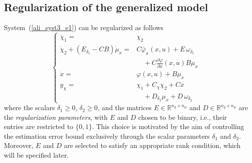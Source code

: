 \documentclass{ifacconf}
\def\eqref#1{(\ref{#1})}
\begin{document}
{%

\subsection{Regularization of the generalized model}
System~\eqref{ali_syst3_e1} can be regularized as follows
\begin{equation}\label{ali_syst3_e2}
\left\{
\begin{array}{rcl}
\dot{\chi}_{1}  = & \chi_{2} 
\\
\dot{\chi}_{2} + \left( E_{\delta_{1}} - C B \right) \dot{\mu}_{x}   = & C  \bar{\varphi}_{x}(x,u)  + E\, \omega_{\delta_{1}}  \\
&\quad+\displaystyle C \frac{\partial \varphi}{\partial x}(x,u) B \mu_{x}
\\ 
\dot{x}  = &  \varphi(x,u) + B \mu_{x} \\
y_{\chi}  = &  \chi_{1} + C_{\chi} \chi_{2} + C x \\%
&\quad +D_{\delta_2} \mu_{x} + D\, \omega_{\delta_{2}} 
\end{array}
\right.
\end{equation}
where the scalars $\delta_1 \geq 0$, $\delta_2 \geq 0$, and the matrices $E\in\mathbb{R}^{n_{y}\times n_{\mu}}$ and $D\in\mathbb{R}^{n_{y}\times n_{\mu}}$ are the {\it regularization parameters}, with $E$ and $D$ chosen to be binary, i.e., their entries are restricted to $\{0,1\}$. This choice is motivated by the aim of controlling the estimation error bound exclusively through the scalar parameters $\delta_1$ and $\delta_2$. Moreover, $E$ and $D$ are selected to satisfy an appropriate rank condition, which will be specified later.


}
\end{document}

